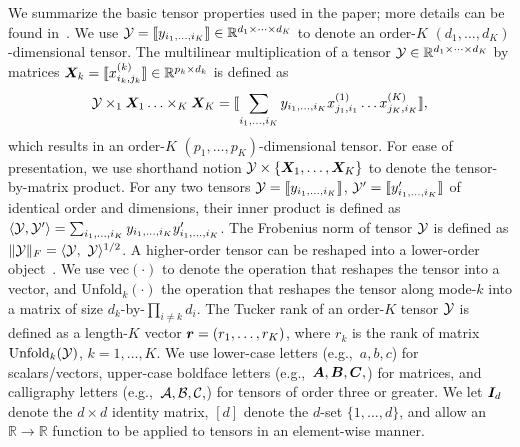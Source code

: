 \documentclass[12pt]{article}
\theoremstyle{plain}
\theoremstyle{definition}
\begin{document}
We summarize the basic tensor properties used in the paper; more details can be found in~\citet{kolda2009tensor}. We use $\mathcal{Y}=\llbracket y_{i_1,\ldots,i_K} \rrbracket\in \mathbb{R}^{d_1\times \cdots\times d_K}$ to denote an order-$K$ $(d_1,\ldots,d_K)$-dimensional tensor. The multilinear multiplication of a tensor $\mathcal{Y}\in\mathbb{R}^{d_1\times \cdots\times d_K}$ by matrices $\bm X_k=\llbracket x_{i_k,j_k}^{(k)} \rrbracket\in\mathbb{R}^{p_k\times d_k}$ is defined as
\begin{equation}
\mathcal{Y} \times_1\bm X_1\ldots \times_K \bm X_K=\llbracket \sum_{i_1,\ldots,i_K}y_{i_1,\ldots,i_K}x_{j_1,i_1}^{(1)}\ldots x_{j_K,i_K}^{(K)} \rrbracket,
\end{equation}
which results in an order-$K$ $(p_1,\ldots,p_K)$-dimensional tensor. For ease of presentation, we use shorthand notion $\mathcal{Y}\times\{\bm X_1,\ldots,\bm X_K\}$ to denote the tensor-by-matrix product. For any two tensors $\mathcal{Y}=\llbracket y_{i_1,\ldots,i_K} \rrbracket$, $\mathcal{Y}'=\llbracket y'_{i_1,\ldots,i_K} \rrbracket$ of identical order and dimensions, their inner product is defined as $\langle \mathcal{Y}, \mathcal{Y}'\rangle =\sum_{i_1,\ldots,i_K}y_{i_1,\ldots,i_K}y'_{i_1,\ldots,i_K}$. The Frobenius norm of tensor $\mathcal{Y}$ is defined as $\FnormSize{}{\tY}=\langle \tY,\ \tY \rangle^{1/2}$. A higher-order tensor can be reshaped into a lower-order object~\citep{wang2017operator}. We use $\text{vec}(\cdot)$ to denote the operation that reshapes the tensor into a vector, and $\text{Unfold}_k(\cdot)$ the operation that reshapes the tensor along mode-$k$ into a matrix of size $d_k$-by-$\prod_{i\neq k}d_i$. The Tucker rank of an order-$K$ tensor $\mathcal{Y}$ is defined as a length-$K$ vector $\bm{r}=(r_1,\ldots,r_K)$, where $r_k$ is the rank of matrix $\text{Unfold}_k(\mathcal{Y})$, $k=1,\ldots,K$. We use lower-case letters (e.g.,\ $a,b,c$) for scalars/vectors, upper-case boldface letters (e.g.,\ $\bm A,\bm B,\bm C,$) for matrices, and calligraphy letters (e.g.,\ $\mathcal{A}, \mathcal{B}, \mathcal{C},$) for tensors of order three or greater. We let $\bm I_d$ denote the $d \times d$ identity matrix, $[d]$ denote the $d$-set $\{1,\ldots,d\}$, and allow an $\mathbb{R}\to \mathbb{R}$ function to be applied to tensors in an element-wise manner. 
\end{document}
